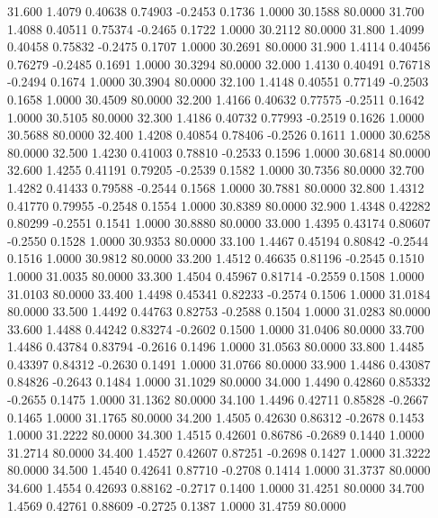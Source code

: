   31.600   1.4079   0.40638   0.74903  -0.2453   0.1736   1.0000  30.1588  80.0000
  31.700   1.4088   0.40511   0.75374  -0.2465   0.1722   1.0000  30.2112  80.0000
  31.800   1.4099   0.40458   0.75832  -0.2475   0.1707   1.0000  30.2691  80.0000
  31.900   1.4114   0.40456   0.76279  -0.2485   0.1691   1.0000  30.3294  80.0000
  32.000   1.4130   0.40491   0.76718  -0.2494   0.1674   1.0000  30.3904  80.0000
  32.100   1.4148   0.40551   0.77149  -0.2503   0.1658   1.0000  30.4509  80.0000
  32.200   1.4166   0.40632   0.77575  -0.2511   0.1642   1.0000  30.5105  80.0000
  32.300   1.4186   0.40732   0.77993  -0.2519   0.1626   1.0000  30.5688  80.0000
  32.400   1.4208   0.40854   0.78406  -0.2526   0.1611   1.0000  30.6258  80.0000
  32.500   1.4230   0.41003   0.78810  -0.2533   0.1596   1.0000  30.6814  80.0000
  32.600   1.4255   0.41191   0.79205  -0.2539   0.1582   1.0000  30.7356  80.0000
  32.700   1.4282   0.41433   0.79588  -0.2544   0.1568   1.0000  30.7881  80.0000
  32.800   1.4312   0.41770   0.79955  -0.2548   0.1554   1.0000  30.8389  80.0000
  32.900   1.4348   0.42282   0.80299  -0.2551   0.1541   1.0000  30.8880  80.0000
  33.000   1.4395   0.43174   0.80607  -0.2550   0.1528   1.0000  30.9353  80.0000
  33.100   1.4467   0.45194   0.80842  -0.2544   0.1516   1.0000  30.9812  80.0000
  33.200   1.4512   0.46635   0.81196  -0.2545   0.1510   1.0000  31.0035  80.0000
  33.300   1.4504   0.45967   0.81714  -0.2559   0.1508   1.0000  31.0103  80.0000
  33.400   1.4498   0.45341   0.82233  -0.2574   0.1506   1.0000  31.0184  80.0000
  33.500   1.4492   0.44763   0.82753  -0.2588   0.1504   1.0000  31.0283  80.0000
  33.600   1.4488   0.44242   0.83274  -0.2602   0.1500   1.0000  31.0406  80.0000
  33.700   1.4486   0.43784   0.83794  -0.2616   0.1496   1.0000  31.0563  80.0000
  33.800   1.4485   0.43397   0.84312  -0.2630   0.1491   1.0000  31.0766  80.0000
  33.900   1.4486   0.43087   0.84826  -0.2643   0.1484   1.0000  31.1029  80.0000
  34.000   1.4490   0.42860   0.85332  -0.2655   0.1475   1.0000  31.1362  80.0000
  34.100   1.4496   0.42711   0.85828  -0.2667   0.1465   1.0000  31.1765  80.0000
  34.200   1.4505   0.42630   0.86312  -0.2678   0.1453   1.0000  31.2222  80.0000
  34.300   1.4515   0.42601   0.86786  -0.2689   0.1440   1.0000  31.2714  80.0000
  34.400   1.4527   0.42607   0.87251  -0.2698   0.1427   1.0000  31.3222  80.0000
  34.500   1.4540   0.42641   0.87710  -0.2708   0.1414   1.0000  31.3737  80.0000
  34.600   1.4554   0.42693   0.88162  -0.2717   0.1400   1.0000  31.4251  80.0000
  34.700   1.4569   0.42761   0.88609  -0.2725   0.1387   1.0000  31.4759  80.0000
